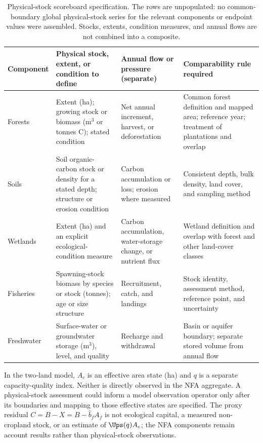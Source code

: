 \begin{table}[htbp]
\centering\footnotesize
\caption{Physical-stock scoreboard specification. The rows are unpopulated: no common-boundary global physical-stock series for the relevant components or endpoint values were assembled. Stocks, extents, condition measures, and annual flows are not combined into a composite.}
\label{tab:si_stock_scoreboard}
\begin{tabularx}{\textwidth}{@{}>{\raggedright\arraybackslash}p{} >{\raggedright\arraybackslash}p{} >{\raggedright\arraybackslash}p{} >{\raggedright\arraybackslash}X@{}}
\toprule
Component & Physical stock, extent, or condition to define & Annual flow or pressure (separate) & Comparability rule required \\
\midrule
Forests & Extent (ha); growing stock or biomass (m$^3$ or tonnes C); stated condition & Net annual increment, harvest, or deforestation & Common forest definition and mapped area; reference year; treatment of plantations and overlap \\
Soils & Soil organic-carbon stock or density for a stated depth; structure or erosion condition & Carbon accumulation or loss; erosion where measured & Consistent depth, bulk density, land cover, and sampling method \\
Wetlands & Extent (ha) and an explicit ecological-condition measure & Carbon accumulation, water-storage change, or nutrient flux & Wetland definition and overlap with forest and other land-cover classes \\
Fisheries & Spawning-stock biomass by species or stock (tonnes); age or size structure & Recruitment, catch, and landings & Stock identity, assessment method, reference point, and uncertainty \\
Freshwater & Surface-water or groundwater storage (m$^3$), level, and quality & Recharge and withdrawal & Basin or aquifer boundary; separate stored volume from annual flow \\
\bottomrule
\end{tabularx}
\end{table}

In the two-land model, $A_c$ is an effective area state (ha) and $q$ is a separate capacity-quality index. Neither is directly observed in the NFA aggregate. A physical-stock assessment could inform a model observation operator only after its boundaries and mapping to those effective states are specified. The proxy residual $C=B-X=B-\hat b_fA_f$ is not ecological capital, a measured non-cropland stock, or an estimate of $\Ups(q)A_c$; the NFA components remain account results rather than physical-stock observations.
